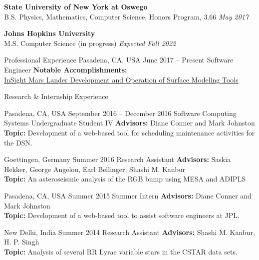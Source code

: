 \documentclass{resume} %
\begin{document}
\textbf{State University of New York at Oswego}
\\
B.S. Physics, Mathematics, Computer Science, Honors Program, 3.66
\hfill
\emph{May 2017}

\textbf{Johns Hopkins University}
\\
M.S. Computer Science (in progress)
\hfill
\emph{Expected Fall 2022}

\begin{rSection}{Professional Experience}{}
           {Pasadena, CA, USA}
           {June 2017 -- Present}
           {Software Engineer}
           {
        \textbf{Notable Accomplishments:}\\
        \href{http://www.oswegocountynewsnow.com/news/mars-landing-puts-phoenix-native-suny-oswego-grad-roffo-among/article_968bd574-f34c-11e8-8c5b-b7d557e9f682.html?fbclid=IwAR1iCW3CdQIRr2JIy1f96utXjzzidSJ6vA13jVgvkjKIU6PopaLHYkpbQrw}{InSight Mars Lander Development and Operation of Surface Modeling Tools}
    }
\end{rSection}

\begin{rSection}{Research \& Internship Experience}{}

           {Pasadena, CA, USA}
           {September 2016 -- December 2016}
           {Software Computing Systems Undergraduate Student IV}
           {
    \textbf{Advisors:}
    Diane Conner and Mark Johnston
    \\
    \textbf{Topic:}
    Development of a web-based tool for scheduling maintenance activities for the DSN.
  }

           {Goettingen, Germany}
           {Summer 2016}
           {Research Assistant}
           {
    \textbf{Advisors:}
    Saskia Hekker, George Angelou, Earl Bellinger, Shashi M. Kanbur
    \\
    \textbf{Topic:}
    An asteroseismic analysis of the RGB bump using MESA and ADIPLS
  }

           {Pasadena, CA, USA}
           {Summer 2015}
           {Summer Intern}
           {
    \textbf{Advisors:}
    Diane Conner and Mark Johnston
    \\
    \textbf{Topic:}
    Development of a web-based tool to assist software engineers at JPL.
  }

           {New Delhi, India}
           {Summer 2014}
           {Research Assistant}
           {
    \textbf{Advisors:}
    Shashi M. Kanbur, H. P. Singh
    \\
    \textbf{Topic:}
    Analysis of several RR Lyrae variable stars in the CSTAR data sets.
  }

\end{rSection}
\end{document}
